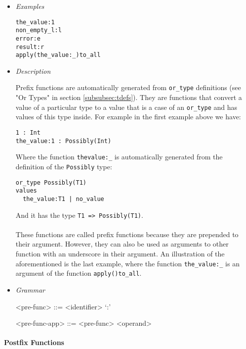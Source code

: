 \documentclass{article}
\begin{document}
\begin{itemize}

\item \textit{Examples}
\begin{verbatim}
the_value:1
non_empty_l:l
error:e
result:r
apply(the_value:_)to_all
\end{verbatim}

\item \textit{Description}

Prefix functions are automatically generated from \texttt{or_type} definitions
(see "Or Types" in section \ref{subsubsec:tdefs}). They are functions that
convert a value of a particular type to a value that is a case of an
\texttt{or_type} and has values of this type inside. For example in the
first example above we have:
\begin{verbatim}
1 : Int
the_value:1 : Possibly(Int)
\end{verbatim}
Where the function \texttt{thevalue:_} is automatically generated from the
definition of the \texttt{Possibly} type:
\begin{verbatim}
or_type Possibly(T1)
values
  the_value:T1 | no_value
\end{verbatim}
And it has the type \texttt{T1 => Possibly(T1)}.
\\\\
These functions are called prefix functions because they are prepended to
their argument. However, they can also be used as arguments to other function
with an underscore in their argument.
An illustration of the aforementioned is the last example, where the function
\texttt{the_value:_} is an argument of the function \texttt{apply()to_all}.

\item \textit{Grammar}
\begin{grammar}
<pre-func> ::= <identifier> `:'

<pre-func-app> ::= <pre-func> <operand>
\end{grammar}

\end{itemize}

\paragraph{Postfix Functions}
\end{document}
